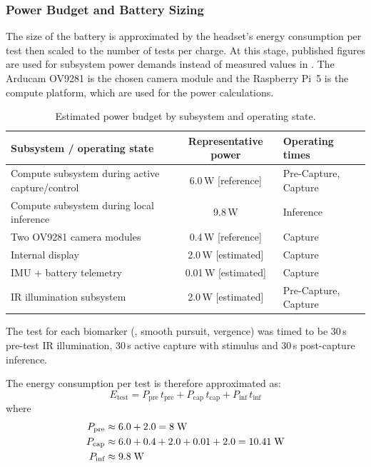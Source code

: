 \subsubsection{Power Budget and Battery Sizing}

The size of the battery is approximated by the headset's energy consumption per test then scaled to the number of tests per charge. At this stage, published figures are used for subsystem power demands instead of measured values in . The Arducam OV9281 is the chosen camera module and the Raspberry Pi~5 is the compute platform, which are used for the power calculations.

\begin{table}[htbp]
    \centering
    \caption{Estimated power budget by subsystem and operating state.}
    \label{tab:power-budget}
    \begin{tabular}{lcl}
        \toprule
        \textbf{Subsystem / operating state} & \textbf{Representative power} & \textbf{Operating times} \\
        \midrule
        Compute subsystem during active capture/control & 6.0\,W [reference] & Pre-Capture, Capture \\
        Compute subsystem during local inference         & 9.8\,W              & Inference \\
        Two OV9281 camera modules                        & 0.4\,W [reference]  & Capture \\
        Internal display                                 & 2.0\,W [estimated]  & Capture \\
        IMU + battery telemetry                          & 0.01\,W [estimated] & Capture \\
        IR illumination subsystem                        & 2.0\,W [estimated]  & Pre-Capture, Capture \\
        \bottomrule
    \end{tabular}
\end{table}

The test for each biomarker (, smooth pursuit, vergence) was timed to be 30\,s pre-test IR illumination, 30\,s active capture with stimulus and 30\,s post-capture inference.

The energy consumption per test is therefore approximated as:
%
\begin{equation}
    E_{\text{test}} = P_{\text{pre}} \, t_{\text{pre}} + P_{\text{cap}} \, t_{\text{cap}} + P_{\text{inf}} \, t_{\text{inf}}
\end{equation}
%
where
%
\begin{align}
    P_{\text{pre}} &\approx 6.0 + 2.0 = 8 \; \text{W} \notag \\
    P_{\text{cap}} &\approx 6.0 + 0.4 + 2.0 + 0.01 + 2.0 = 10.41 \; \text{W} \notag \\
    P_{\text{inf}} &\approx 9.8 \; \text{W} \notag
\end{align}

